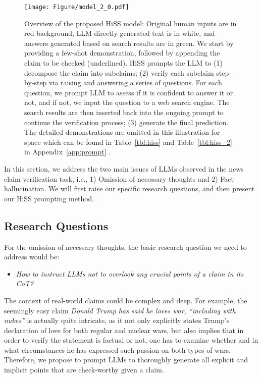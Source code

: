 \documentclass[11pt]{article}
\begin{document}
\begin{figure*}[thb!]
\centering
\centering 
\texttt{[image: Figure/model\_2\_0.pdf]} 
\caption{Overview of the proposed HiSS model: Original human inputs are in red background, LLM directly generated text is in white, and answers generated based on search results are in green. We start by providing a few-shot demonstration, followed by appending the claim to be checked (underlined). HiSS prompts the LLM to (1) decompose the claim into subclaims; (2) verify each subclaim step-by-step via raising and answering a series of questions. For each question, we prompt LLM to assess if it is confident to answer it or not, and if not, we input the question to a web search engine. The search results are then inserted back into the ongoing prompt to continue the verification process; (3) generate the final prediction. The detailed demonstrations are omitted in this illustration for space which can be found in Table~\ref{tbl:hiss} and Table~\ref{tbl:hiss_2} in Appendix~\ref{app:prompt} .}
\label{framework}
\end{figure*}


In this section, we address the two main issues of LLMs observed in the news claim verification task, i.e., 1) Omission of necessary thoughts and 2) Fact hallucination. We will first raise our specific research questions, and then present our HiSS prompting method.

\subsection{Research Questions}
For the omission of necessary thoughts, the basic research question we need to address would be: 
\begin{itemize}
\item \emph{How to instruct LLMs not to overlook any crucial points of a claim in its CoT?}
\end{itemize}
The context of real-world claims could be complex and deep. For example, the seemingly easy claim \emph{Donald Trump has said he loves war, ``including with nukes''} is actually quite intricate, as it not only explicitly states Trump's declaration of love for both regular and nuclear wars, but also implies that in order to verify the statement is factual or not, one has to examine whether and in what circumstances he has expressed such passion on both types of wars. Therefore, we propose to prompt LLMs to thoroughly generate all explicit and implicit points that are check-worthy given a claim. 
\end{document}
